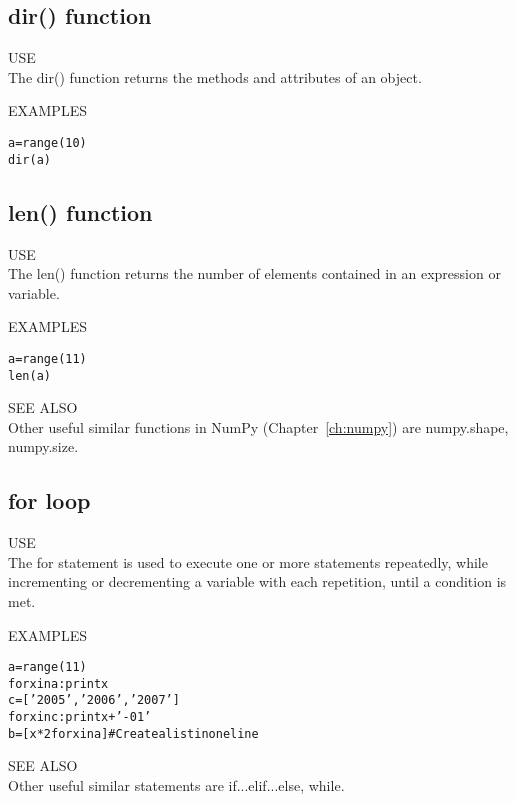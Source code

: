 \subsection{ {\sf dir() } function}
{\color{blue} {\sf\small USE}} \\
The {\sf\small dir()} function returns the methods and attributes of
an object.
  
{\color{blue} {\sf\small EXAMPLES}} 
\begin{alltt}
\pytab a = range(10) 
\pytab dir(a) 
\end{alltt}

\subsection{ {\sf len() } function}
{\color{blue} {\sf\small USE}} \\
The {\sf\small len()} function returns the number of elements
contained in an expression or variable.

{\color{blue} {\sf\small EXAMPLES}} 
\begin{alltt}
\pytab a = range(11) 
\pytab len(a) 
\end{alltt}
{\color{blue} {\sf\small SEE ALSO}} \\
Other useful similar functions in NumPy (Chapter~\ref{ch:numpy}) are
{\sf\small numpy.shape, numpy.size}.


\subsection{ {\sf for } loop}
{\color{blue} {\sf\small USE}} \\
The {\sf\small for } statement is used to execute one or more
statements repeatedly, while incrementing or decrementing a variable
with each repetition, until a condition is met.

{\color{blue} {\sf\small EXAMPLES}} 
\begin{alltt}
\pytab a = range(11)
\pytab for x in a: print x
\pytab c = ['2005', '2006', '2007']
\pytab for x in c: print x + '-01'
\pytab b = [x*2 for x in a]  #Create a list in one line
\end{alltt}
  
{\color{blue} {\sf\small SEE ALSO}} \\
Other useful similar statements are {\sf\small if...elif...else, while}.  \\


